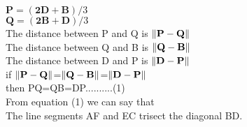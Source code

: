 \documentclass[10pt, a4paper]{article}
\let\vec\mathbf
\begin{document}
\begin{center}
		\begin{center}
		$\vec{P}=(\vec{2D}+\vec{B})/3$\\
$\vec{Q}=(\vec{2B}+\vec{D})/3$\\
		The distance between P and Q is $\norm{\vec{P}-\vec{Q}}$\\
		The distance between Q and B is $\norm{\vec{Q}-\vec{B}}$\\
		The distance between D and P is $\norm{\vec{D}-\vec{P}}$\\
		if $\norm{\vec{P}-\vec{Q}}$=$\norm{\vec{Q}-\vec{B}}$=$\norm{\vec{D}-\vec{P}}$\\
		then PQ=QB=DP..........(1)\\
		From equation (1) we can say that\\
		 The line segments AF and EC trisect the diagonal BD.\\
		\end{center}

\end{center}
\end{document}

